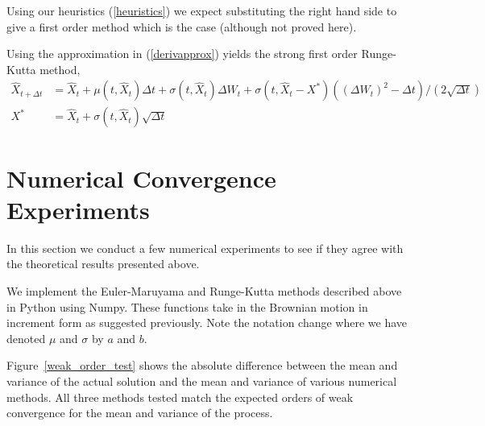 \documentclass[12pt]{article}
\begin{document}
Using our heuristics (\ref{heuristics}) we expect substituting the right hand side to give a first order method which is the case (although not proved here).

Using the approximation in (\ref{derivapprox}) yields the strong first order Runge-Kutta method,
\begin{align*}
    \hat{X}_{t+\Delta t} &= \hat{X}_t + \mu(t,\hat{X}_{t}) \Delta t + \sigma(t,\hat{X}_{t}) \Delta W_{t} + \sigma(t,\hat{X}_t-X^*) \left( (\Delta W_t)^2 - \Delta t \right) / (2 \sqrt{\Delta t}) \\
    X^* &=  \hat{X}_t  + \sigma(t,\hat{X}_t)\sqrt{\Delta t}
\end{align*}

\section{Numerical Convergence Experiments}
In this section we conduct a few numerical experiments to see if they agree with the theoretical results presented above.

We implement the Euler-Maruyama and Runge-Kutta methods described above in Python using Numpy. These functions take in the Brownian motion in increment form as suggested previously. Note the notation change where we have denoted \( \mu \) and \( \sigma \) by \( a \) and \( b \).





Figure~\ref{weak_order_test} shows the absolute difference between the mean and variance of the actual solution and the mean and variance of various numerical methods. All three methods tested match the expected orders of weak convergence for the mean and variance of the process.
\end{document}
